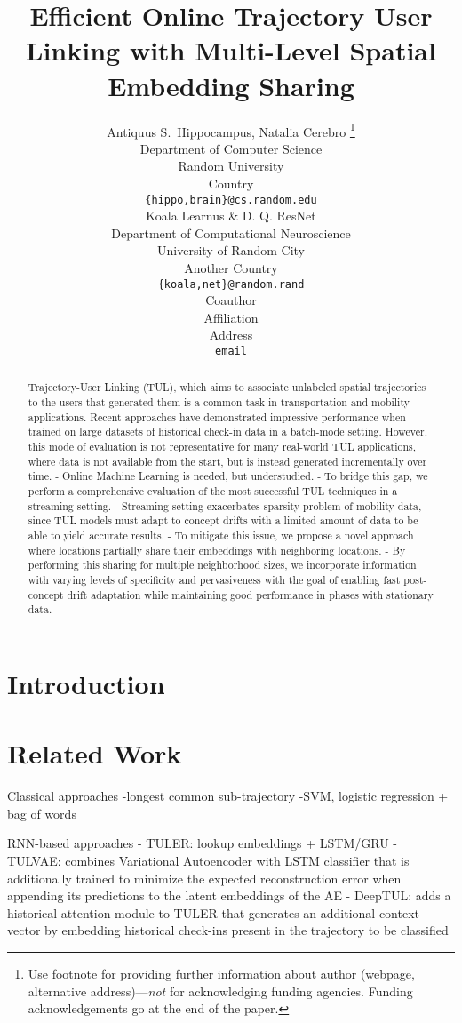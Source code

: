 \documentclass{article} %
\title{Efficient Online Trajectory User Linking with Multi-Level Spatial Embedding Sharing}
\author{Antiquus S.~Hippocampus, Natalia Cerebro  \thanks{ Use footnote for providing further information
about author (webpage, alternative address)---\emph{not} for acknowledging
funding agencies.  Funding acknowledgements go at the end of the paper.} \\
Department of Computer Science\\
Random University\\
Country \\
\texttt{\{hippo,brain\}@cs.random.edu} \\
\And %
Koala Learnus \& D. Q. ResNet  \\
Department of Computational Neuroscience \\
University of Random City \\
Another Country \\
\texttt{\{koala,net\}@random.rand} \\
\AND %
Coauthor \\
Affiliation \\
Address \\
\texttt{email}
}
\begin{document}
\maketitle

\begin{abstract}
   Trajectory-User Linking (TUL), which aims to associate unlabeled spatial trajectories to the users that generated them is a common task in transportation and mobility applications. Recent approaches have demonstrated impressive performance when trained on large datasets of historical check-in data in a batch-mode setting. However, this mode of evaluation is not representative for many real-world TUL applications, where data is not available from the start, but is instead generated incrementally over time. 
   - Online Machine Learning is needed, but understudied. 
   - To bridge this gap, we perform a comprehensive evaluation of the most successful TUL techniques in a streaming setting.
   - Streaming setting exacerbates sparsity problem of mobility data, since TUL models must adapt to concept drifts with a limited amount of data to be able to yield accurate results.
   - To mitigate this issue, we propose a novel approach where locations partially share their embeddings with neighboring locations. 
   - By performing this sharing for multiple neighborhood sizes, we incorporate information with varying levels of specificity and pervasiveness with the goal of enabling fast post-concept drift adaptation while maintaining good performance in phases with stationary data.
\end{abstract}

\section{Introduction}



\section{Related Work}

Classical approaches 
-longest common sub-trajectory
-SVM, logistic regression + bag of words

RNN-based approaches
- TULER: lookup embeddings + LSTM/GRU
- TULVAE: combines Variational Autoencoder with LSTM classifier that is additionally trained to minimize the expected reconstruction error when appending its predictions to the latent embeddings of the AE
- DeepTUL: adds a historical attention module to TULER that generates an additional context vector by embedding historical check-ins present in the trajectory to be classified
\end{document}

